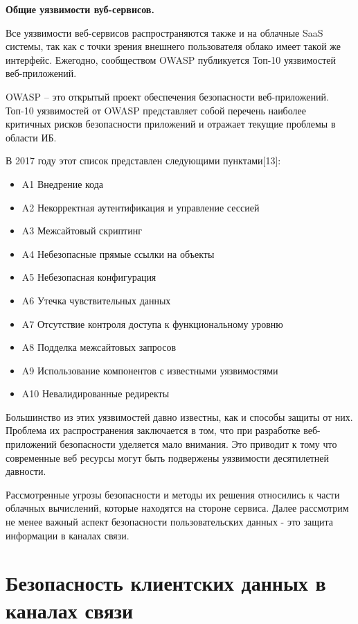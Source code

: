 \textbf{Общие уязвимости вуб-сервисов.}

Все уязвимости веб-сервисов распространяются также и на облачные SaaS системы, так как с точки зрения внешнего пользователя облако имеет такой же интерфейс. Ежегодно, сообществом OWASP публикуется Топ-10 уязвимостей веб-приложений.

OWASP – это открытый проект обеспечения безопасности веб-приложений. Топ-10 уязвимостей от OWASP представляет собой перечень наиболее критичных рисков безопасности приложений и отражает текущие проблемы в области ИБ. 

В 2017 году этот список представлен следующими пунктами[13]:

\begin{itemize}
	\item A1 Внедрение кода
	\item A2 Некорректная аутентификация и управление сессией
	\item A3 Межсайтовый скриптинг
	\item A4 Небезопасные прямые ссылки на объекты
	\item A5 Небезопасная конфигурация
	\item A6 Утечка чувствительных данных
	\item A7 Отсутствие контроля доступа к функциональному уровню
	\item A8 Подделка межсайтовых запросов
	\item A9 Использование компонентов с известными уязвимостями
	\item A10 Невалидированные редиректы
\end{itemize}

Большинство из этих уязвимостей давно известны, как и способы защиты от них. Проблема их распространения заключается в том, что при разработке веб-приложений безопасности уделяется мало внимания. Это приводит к тому что современные веб ресурсы могут быть подвержены уязвимости десятилетней давности.

Рассмотренные угрозы безопасности и методы их решения относились к части облачных вычислений, которые находятся на стороне сервиса. Далее рассмотрим не менее важный аспект безопасности пользовательских данных - это защита информации в каналах связи.

\section{Безопасность клиентских данных в каналах связи}

